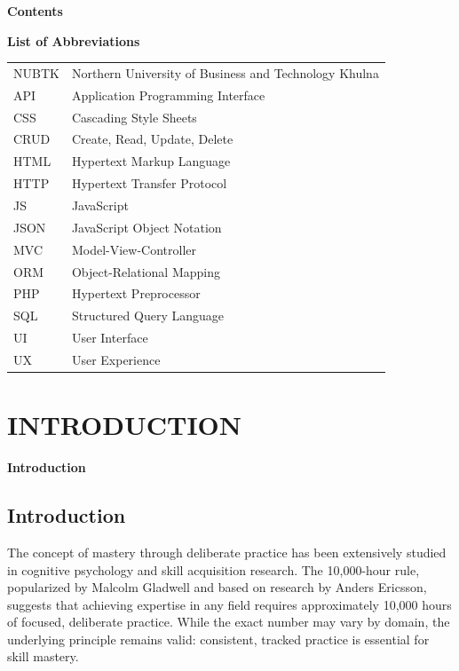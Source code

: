 \documentclass[12pt,a4paper]{report}
\newcommand{\JustifiedNormal}{\fontsize{12}{14}\selectfont\justifying\setlength{\parindent}{0pt}}
\begin{document}
\clearpage

\begin{center}
  {\fontsize{14}{17}\selectfont\bfseries Contents}
\end{center}
\vspace{1em}
\tableofcontents

\clearpage
\listoftables
\clearpage
\listoffigures

\clearpage

\begin{center}
  {\fontsize{14}{17}\selectfont\bfseries List of Abbreviations}
\end{center}
\vspace{2em}
\begin{tabular}{ll}
NUBTK & Northern University of Business and Technology Khulna \\
API & Application Programming Interface \\
CSS & Cascading Style Sheets \\
CRUD & Create, Read, Update, Delete \\
HTML & Hypertext Markup Language \\
HTTP & Hypertext Transfer Protocol \\
JS & JavaScript \\
JSON & JavaScript Object Notation \\
MVC & Model-View-Controller \\
ORM & Object-Relational Mapping \\
PHP & Hypertext Preprocessor \\
SQL & Structured Query Language \\
UI & User Interface \\
UX & User Experience \\
\end{tabular}

\clearpage

\setcounter{page}{1}

\chapter{INTRODUCTION}
\begin{center}
  {\fontsize{14}{17}\selectfont\bfseries Introduction}
\end{center}
\vspace{1em}

\section{Introduction}
\JustifiedNormal
The concept of mastery through deliberate practice has been extensively studied in cognitive psychology and skill acquisition research. The 10,000-hour rule, popularized by Malcolm Gladwell and based on research by Anders Ericsson, suggests that achieving expertise in any field requires approximately 10,000 hours of focused, deliberate practice. While the exact number may vary by domain, the underlying principle remains valid: consistent, tracked practice is essential for skill mastery.
\end{document}
